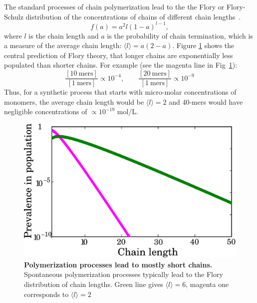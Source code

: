 \documentclass[journal=jacsat,manuscript=article,layout=twocolumn]{achemso}
\newcommand*{\pq}[1]{\left[ #1 \right]}
\begin{document}
The standard processes of chain polymerization lead to the the Flory or 
Flory-Schulz distribution of the concentrations of chains of different chain 
lengths~\cite{Flory1953}. 
\begin{equation}
 f(a)=a^2l(1-a)^{l-1},\label{eq:flory}
\end{equation} 
where $l$ is the chain length and $a$ is the probability of chain termination, 
which is a measure of the average chain length: $\langle l \rangle = a(2- a)$.
Figure \ref{fig:flory} shows the central prediction of Flory theory, that 
longer chains are exponentially less populated than shorter chains.  For example (see the magenta 
line 
in Fig~\ref{fig:flory}):
\begin{equation}  
\frac{\pq{10~\mathrm{mers}}}{\pq{1~\mathrm{mers}}}\propto10^{-4},\qquad\frac{\pq{20~\mathrm{mers}}}{
\pq{1~\mathrm{mers}}}\propto10^{-9}
\end{equation} 
Thus, for a synthetic process that starts with micro-molar concentrations of monomers, the 
average chain length would be $\langle l \rangle = 2$ and 40-mers would have 
negligible concentrations of $\propto 10^{-19} $ mol/L. 
\begin{figure}[h!]
  \centering
  \includegraphics[width=\columnwidth]{pictures/flory2.pdf} 
  \caption{\textbf{Polymerization processes lead to mostly short chains.}  Spontaneous 
polymerization processes typically lead to the Flory distribution of chain lengths. 
Green line gives $\langle  l \rangle= 6$, magenta one corresponds to $\langle l \rangle=2$}
  \label{fig:flory}
\end{figure}
\end{document}
